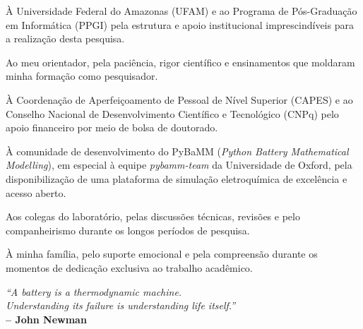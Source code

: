 \documentclass[
    12pt,
    openright,
    twoside,
    a4paper,
    brazil,
    english
]{abntex2}
\begin{document}
\begin{agradecimentos}
À Universidade Federal do Amazonas (UFAM) e ao Programa de Pós-Graduação em
Informática (PPGI) pela estrutura e apoio institucional imprescindíveis para a
realização desta pesquisa.

Ao meu orientador, pela paciência, rigor científico e ensinamentos que moldaram
minha formação como pesquisador.

À Coordenação de Aperfeiçoamento de Pessoal de Nível Superior (CAPES) e ao
Conselho Nacional de Desenvolvimento Científico e Tecnológico (CNPq) pelo
apoio financeiro por meio de bolsa de doutorado.

À comunidade de desenvolvimento do PyBaMM (\textit{Python Battery Mathematical
Modelling}), em especial à equipe \textit{pybamm-team} da Universidade de Oxford,
pela disponibilização de uma plataforma de simulação eletroquímica de excelência
e acesso aberto.

Aos colegas do laboratório, pelas discussões técnicas, revisões e pelo companheirismo
durante os longos períodos de pesquisa.

À minha família, pelo suporte emocional e pela compreensão durante os momentos de
dedicação exclusiva ao trabalho acadêmico.
\end{agradecimentos}

\begin{epigrafe}
  \vspace*{\fill}
  \begin{flushright}
    \textit{``A battery is a thermodynamic machine.\\
    Understanding its failure is understanding life itself.''}\\
    \textbf{-- John Newman}
  \end{flushright}
\end{epigrafe}
\end{document}

